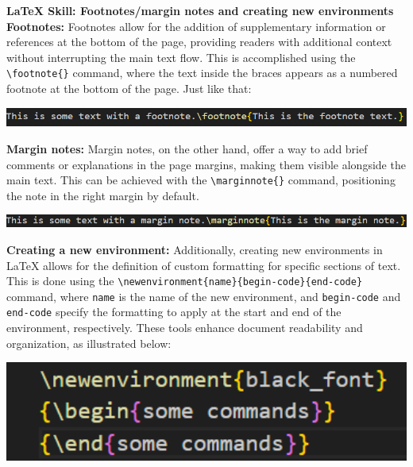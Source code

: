 \documentclass[a4paper, 11pt]{report}
\begin{document}
\textbf{\large{LaTeX Skill: Footnotes/margin notes and creating new environments}}
\textbf{Footnotes:}
Footnotes allow for the addition of supplementary information or references at the bottom of the page, providing readers with additional context without interrupting the main text flow. This is accomplished using the \verb|\footnote{}| command, where the text inside the braces appears as a numbered footnote at the bottom of the page. Just like that:

\begin{center}
\includegraphics[width=1.0\textwidth, keepaspectratio]{ZIXI_MAI_footnote.png}
\end{center}

\textbf{Margin notes:}
Margin notes, on the other hand, offer a way to add brief comments or explanations in the page margins, making them visible alongside the main text. This can be achieved with the \verb|\marginnote{}| command, positioning the note in the right margin by default.

\begin{center}
\includegraphics[width=1.0\textwidth, keepaspectratio]{ZIXI_MAI_marginnote.png}
\end{center}

\textbf{Creating a new environment:}
Additionally, creating new environments in LaTeX allows for the definition of custom formatting for specific sections of text. This is done using the \verb|\newenvironment{name}{begin-code}{end-code}| command, where \verb|name| is the name of the new environment, and \verb|begin-code| and \verb|end-code| specify the formatting to apply at the start and end of the environment, respectively. These tools enhance document readability and organization, as illustrated below:

\begin{center}
\includegraphics[width=1.0\textwidth, keepaspectratio]{ZIXI_MAI_newenvironment.png}
\end{center}
\end{document}

